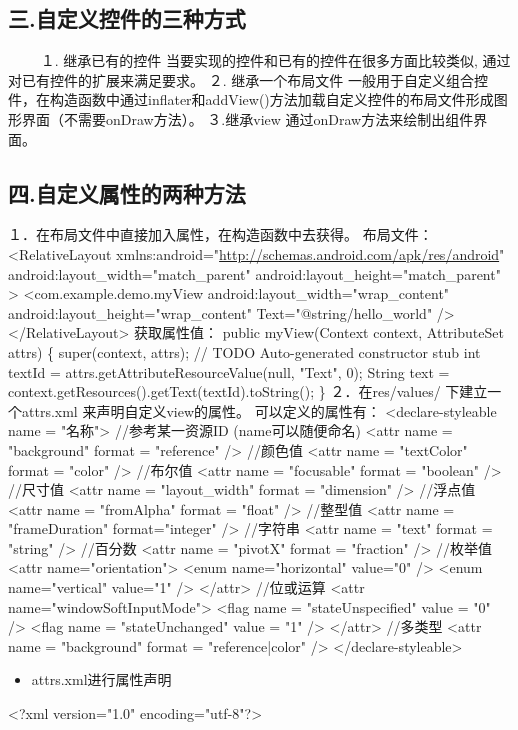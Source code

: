 \documentclass[9pt, b5paper]{article}
\begin{document}
\subsection{三.自定义控件的三种方式}
\label{sec-10-3}
  　　
 １. 继承已有的控件
当要实现的控件和已有的控件在很多方面比较类似, 通过对已有控件的扩展来满足要求。
 ２. 继承一个布局文件
一般用于自定义组合控件，在构造函数中通过inflater和addView()方法加载自定义控件的布局文件形成图形界面（不需要onDraw方法）。
３.继承view
通过onDraw方法来绘制出组件界面。
\subsection{四.自定义属性的两种方法}
\label{sec-10-4}
１．在布局文件中直接加入属性，在构造函数中去获得。
布局文件：
<RelativeLayout xmlns:android="\url{http://schemas.android.com/apk/res/android}"
    android:layout\_width="match\_parent"
    android:layout\_height="match\_parent"
    >
     <com.example.demo.myView
         android:layout\_width="wrap\_content"
         android:layout\_height="wrap\_content" 
         Text="@string/hello\_world"
         />
</RelativeLayout>
获取属性值：
public myView(Context context, AttributeSet attrs) \{
        super(context, attrs);
        // TODO Auto-generated constructor stub
int textId = attrs.getAttributeResourceValue(null, "Text", 0);
String text = context.getResources().getText(textId).toString();
    \}
２．在res/values/ 下建立一个attrs.xml 来声明自定义view的属性。
可以定义的属性有：
<declare-styleable name = "名称"> 
//参考某一资源ID (name可以随便命名)
<attr name = "background" format = "reference" /> 
//颜色值 
<attr name = "textColor" format = "color" /> 
//布尔值
<attr name = "focusable" format = "boolean" /> 
//尺寸值 
<attr name = "layout\_width" format = "dimension" /> 
//浮点值 
<attr name = "fromAlpha" format = "float" /> 
//整型值 
<attr name = "frameDuration" format="integer" /> 
//字符串 
<attr name = "text" format = "string" /> 
//百分数 
<attr name = "pivotX" format = "fraction" /> 
//枚举值 
<attr name="orientation"> 
<enum name="horizontal" value="0" /> 
<enum name="vertical" value="1" /> 
</attr> 
//位或运算 
<attr name="windowSoftInputMode"> 
<flag name = "stateUnspecified" value = "0" /> 
<flag name = "stateUnchanged" value = "1" /> 
</attr> 
//多类型
<attr name = "background" format = "reference|color" /> 
</declare-styleable> 
\begin{itemize}
\item attrs.xml进行属性声明
\end{itemize}
<?xml version="1.0" encoding="utf-8"?>
\end{document}
